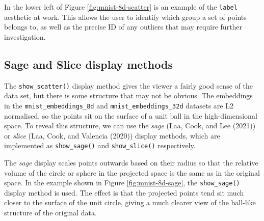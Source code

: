 In the lower left of Figure \ref{fig:mnist-8d-scatter} is an example of the \texttt{label} aesthetic at work. This allows the user to identify which group a set of points belongs to, as well as the precise ID of any outliers that may require further investigation.

\hypertarget{sage-and-slice-display-methods}{%
\subsection{Sage and Slice display methods}\label{sage-and-slice-display-methods}}

The \texttt{show\_scatter()} display method gives the viewer a fairly good sense of the data set, but there is some structure that may not be obvious. The embeddings in the \texttt{mnist\_embeddings\_8d} and \texttt{mnist\_embeddings\_32d} datasets are L2 normalised, so the points sit on the surface of a unit ball in the high-dimensional space. To reveal this structure, we can use the \emph{sage} (Laa, Cook, and Lee (2021)) or \emph{slice} (Laa, Cook, and Valencia (2020)) display methods, which are implemented as \texttt{show\_sage()} and \texttt{show\_slice()} respectively.

The \emph{sage} display scales points outwards based on their radius so that the relative volume of the circle or sphere in the projected space is the same as in the original space. In the example shown in Figure \ref{fig:mnist-8d-sage}, the \texttt{show\_sage()} display method is used. The effect is that the projected points tend sit much closer to the surface of the unit circle, giving a much clearer view of the ball-like structure of the original data.

